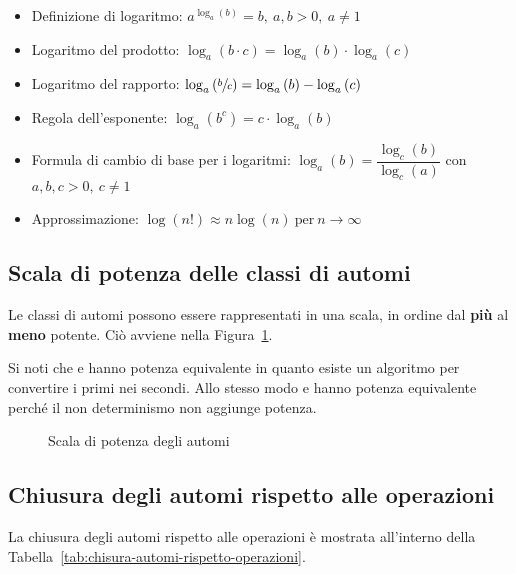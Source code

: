 \documentclass[italian, 10pt]{article}
\begin{document}
\begin{itemize}
  \item Definizione di logaritmo:  \(a^{\log_a{(b)}} = b,\ a, b > 0,\ a \neq 1\)
  \item Logaritmo del prodotto: \(\log_a{(b \cdot c)} = \log_a{(b) \cdot \log_a{(c)}}\)
  \item Logaritmo del rapporto: \(\log_a{\left(\sfrac{b}{c}\right)} = \log_a{(b)} - \log_a{(c)}\)
  \item Regola dell'esponente: \(\log_a{\left(b^c\right)} = c \cdot \log_a{(b)}\)
  \item Formula di cambio di base per i logaritmi: \(\log_a{(b)} = \dfrac{\log_c{(b)}}{\log_c{(a)}}\) con \(a, b, c > 0,\ c \neq 1\)
  \item Approssimazione: \(\log{(n!)}\approx n \log{(n)}\ \text{per}\ {n \rightarrow \infty}\)
\end{itemize}

\subsection{Scala di potenza delle classi di automi}

Le classi di automi possono essere rappresentati in una scala, in ordine dal \textbf{più} al \textbf{meno} potente.
Ciò avviene nella Figura~\ref{fig:scala-potenza-automi}.

Si noti che \NFA e \FSA hanno potenza equivalente in quanto esiste un algoritmo per convertire i primi nei secondi.
Allo stesso modo \TM e \NTM hanno potenza equivalente perché il non determinismo non aggiunge potenza.

\begin{figure}[htbp]
  \bigskip
  \centering
  \caption{Scala di potenza degli automi}
  \label{fig:scala-potenza-automi}
  \bigskip
\end{figure}

\subsection{Chiusura degli automi rispetto alle operazioni}

La chiusura degli automi rispetto alle operazioni è mostrata all'interno della Tabella~\ref{tab:chisura-automi-rispetto-operazioni}.
\end{document}

